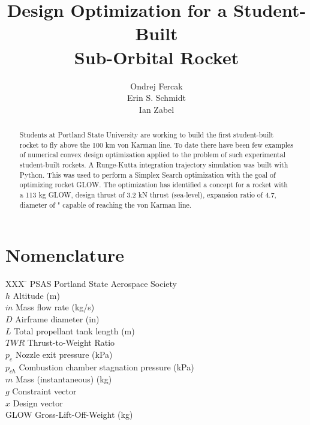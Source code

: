\documentclass[]{aiaa-tc}%
\title{Design Optimization for a Student-Built \\ Sub-Orbital Rocket}
\author{
  Ondrej Fercak\\
  Erin S. Schmidt\\
  Ian Zabel\\  
 }
\begin{document}
\maketitle

\begin{abstract}
Students at Portland State University are working to build the first student-built rocket to fly above the 100 km von Karman line. To date there have been few examples of numerical convex design optimization applied to the problem of such experimental student-built rockets. A Runge-Kutta integration trajectory simulation was built with Python. This was used to perform a Simplex Search optimization with the goal of optimizing rocket GLOW. The optimization has identified a concept for a rocket with a 113 kg GLOW, design thrust of 3.2 kN thrust (sea-level), expansion ratio of 4.7, diameter of " capable of reaching the von Karman line.
\end{abstract}

\section*{Nomenclature}

\begin{tabbing}
  XXX \= \kill%
  PSAS \qquad Portland State Aerospace Society\\
  $h$ \qquad Altitude (m)\\
  $\dot{m}$ \qquad  Mass flow rate (kg/s)\\
  $D$ \qquad Airframe diameter (in)\\
  $L$ \qquad Total propellant tank length (m)\\
  $TWR$ \qquad Thrust-to-Weight Ratio \\
  $p_e$ \qquad Nozzle exit pressure (kPa)\\
  $p_{ch}$ \qquad Combustion chamber stagnation pressure (kPa)\\
  $m$ \qquad Mass (instantaneous) (kg)\\
  $g$ \qquad Constraint vector\\
  $x$ \qquad Design vector\\
  GLOW \qquad Gross-Lift-Off-Weight (kg)\\

 \end{tabbing}
\end{document}
